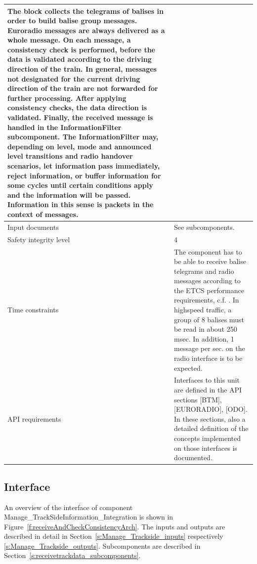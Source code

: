 \begin{longtable}{p{}p{}}
The block collects the telegrams of balises in order to build balise group messages. Euroradio messages are always delivered as a whole message. On each message, a consistency check is performed, before the data is validated according to the driving direction of the train. In general, messages not designated for the current driving direction of the train are not forwarded for further processing. After applying consistency checks, the data direction is validated. Finally, the received message is handled in the InformationFilter subcomponent. The InformationFilter may, depending on level, mode and announced level transitions and radio handover scenarios, let information pass immediately, reject information, or buffer information for some cycles until certain conditions apply and the information will be passed. Information in this sense is packets in the context of messages.\\
\midrule
Input documents			& See subcomponents.\\
\midrule
Safety integrity level	& 4 \\
\midrule
Time constraints		& The component has to be able to receive balise telegrams and radio messages according to the ETCS performance requirements, c.f. \cite{subset-41}. In highspeed traffic, a group of 8 balises must be read in about 250 msec. In addition, 1 message per sec. on the radio interface is to be expected.\\
\midrule
API requirements 		& Interfaces to this unit are defined in the API sections [BTM], [EURORADIO], [ODO]. In these sections, also a detailed definition of the concepts implemented on those interfaces is documented.
 \\
\bottomrule
\end{longtable}


\subsection{Interface}

An overview of the interface of component Manage\_TrackSideInformation\_Integration is shown in Figure~\ref{f:receiveAndCheckConsistencyArch}. The inputs and outputs are described in detail in Section~\ref{s:Manage_Trackside_inputs} respectively \ref{s:Manage_Trackside_outputs}. Subcomponents are described in Section~\ref{s:receivetrackdata_subcomponents}.

